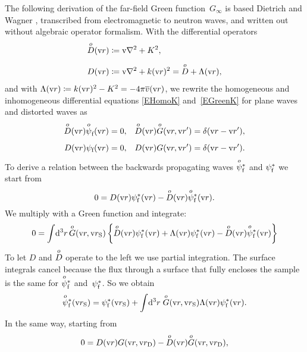 The following derivation of the far-field Green function~$G_\infty$
%
is based Dietrich and Wagner \cite{DiWa84,DiWa16},
transcribed from electromagnetic to neutron waves,
and written out without algebraic operator formalism.
With the differential operators
\begin{align}
    \Do(\r) &\coloneqq \Nabla^2+K^2, \label{EDDefVac} \\[1.2ex]
    D(\r) &\coloneqq \Nabla^2+k(\r)^2 = \Do + \Lambda(\r), \label{EDDefFul}
\end{align}
%
and with $\Lambda(\r)\coloneqq k(\r)^2-K^2=-4\pi\mv(\r)$,
%
we rewrite the homogeneous and inhomogeneous differential equations \cref{EHomoK}
and~\cref{EGreenK} for plane waves and distorted waves as
\begin{align}\label{EHIDG}
    \Do(\r)\pfo  (\r) = 0, &\quad \Do(\r)\Go(\r,\r') = \delta(\r-\r'), \\[1.2ex]
    D(\r)\psi_\sf(\r) = 0, &\quad D(\r)  G  (\r,\r') = \delta(\r-\r').
\end{align}
To derive a relation between the backwards propagating waves $\pfoc$ and $\psi^*_\sf$ we start from%
\begin{equation}
  0 = D(\r)\psi^*_\sf(\r) - \Do(\r)\pfoc(\r).
\end{equation}
We multiply with a Green function and integrate:
\begin{equation}
  0 = \int\!\d^3r\,\Go(\r,\rS)
         \left\{\Do(\r)\psi^*_\sf(\r) + \Lambda(\r)\psi^*_\sf(\r)- \Do(\r)\pfoc(\r)\right\}
\end{equation}
To let $D$ and $\Do$ operate to the left
we use partial integration.
The surface integrals cancel because the flux through a surface that fully encloses the sample
is the same for $\pfoc$ and~$\psi^*_\sf$.
So we obtain
\begin{equation}\label{EPsiPfo1}
  \pfoc(\rS) = \psi^*_\sf(\rS) + \int\!\d^3r\;\Go(\r,\rS)\Lambda(\r)\psi^*_\sf(\r).
\end{equation}
In the same way, starting from
\begin{equation}
  0 = D(\r)G(\r,\rD) - \Do(\r)\Go(\r,\rD),
\end{equation}
